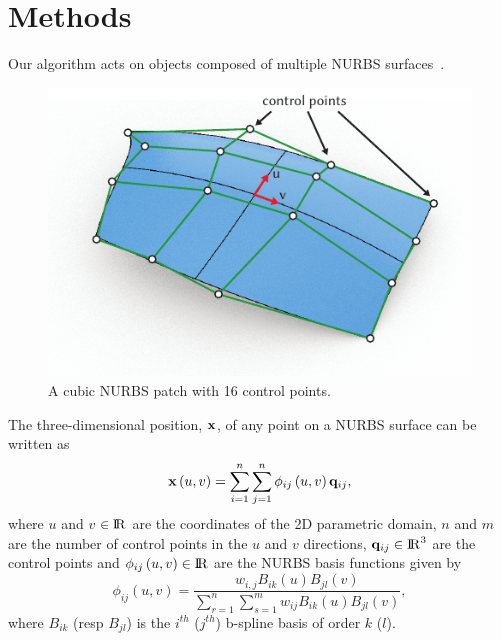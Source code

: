 \section{Methods}

Our algorithm acts on objects composed of multiple NURBS surfaces~.

\begin{figure}
    \includegraphics[width=\columnwidth]{figures/nurbs_patch}
    \caption{A cubic NURBS patch with 16 control points.}
    \label{fig:NURBS}
\end{figure}

The three-dimensional position, $\mathbf{x}$, of any point on a NURBS surface can be written as 
\begin{equation}
\label{eqn:nurbs_srf}
\mathbf{x}\left(u,v\right) = \sum_{i=1}^n\sum_{j=1}^n \phi_{ij}\left(u,v\right)\mathbf{q}_{ij},
\end{equation}
where $u$ and $v$ $\in {\rm I\!R}$ are the coordinates of the 2D parametric domain, $n$ and $m$ are the number of control points in the $u$ and $v$ directions, $\mathbf{q}_{ij}\in{\rm I\!R}^3$ are the control points and $\phi_{ij}\left(u,v\right)\in{\rm I\!R}$ are the NURBS
basis functions given by 
\begin{equation*}
    \phi_{ij}\left(u,v\right) = \frac{w_{i,j}B_{ik}(u)B_{jl}(v)}{\sum_{r=1}^{n}\sum_{s=1}^{m} w_{ij} B_{ik}(u)B_{jl}(v)},
\end{equation*} where $B_{ik}$ (resp $B_{jl}$) is the $i^{th}$ ($j^{th}$) b-spline basis of order $k$ ($l$). 

